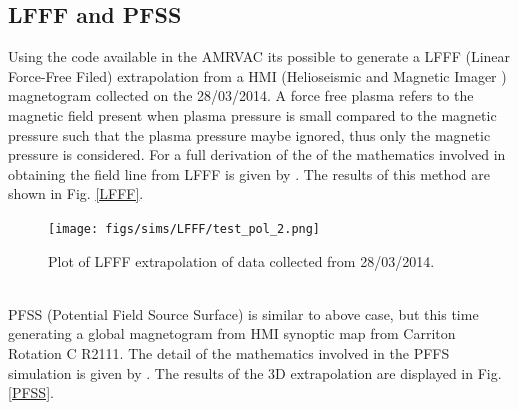 \documentclass[12pt,a4paper,twoside]{article}
\begin{document}
\subsection{LFFF and PFSS}
Using the code available in the AMRVAC its possible to generate a LFFF (Linear Force-Free Filed) extrapolation from a HMI (Helioseismic and Magnetic Imager ) magnetogram collected on the 28/03/2014. A force free plasma refers to the magnetic field  present when plasma pressure is small compared to the magnetic pressure such that the plasma pressure maybe ignored, thus only the magnetic pressure is considered. For a full derivation of the of the mathematics involved in obtaining the field line from LFFF is given by \cite{Wiegelmann2012}. The results of this method are shown in Fig. \eqref{LFFF}.   
\\
\begin{figure}[h]
 \centering
 \texttt{[image: figs/sims/LFFF/test\_pol\_2.png]}
 \caption{Plot of LFFF extrapolation of data collected from 28/03/2014.}
 \label{LFFF}
\end{figure} \\
PFSS (Potential Field Source Surface) is similar to above case, but this time generating a global magnetogram from HMI synoptic map from Carriton Rotation C R2111. The detail of the mathematics involved in the PFFS simulation is given by \cite{Porth2014}. The results of the 3D extrapolation are displayed in Fig. \eqref{PFSS}. \\
\end{document}
